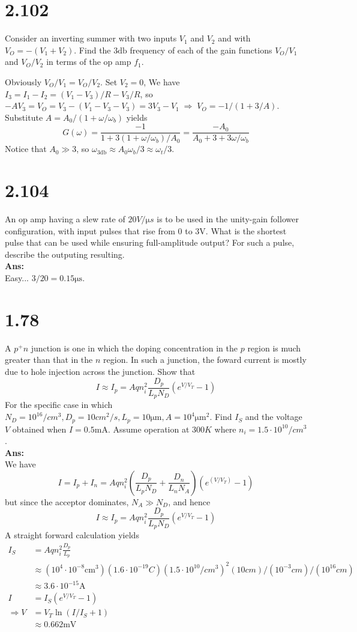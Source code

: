 \documentclass[12pt, a4paper]{article}
\newcommand{\samp}{\si{\ampere}}
\newcommand{\smia}{\si{\milli\ampere}}
\newcommand{\svol}{\si{\volt}}
\newcommand{\sdb}{\si{\decibel}}
\newcommand{\Ans}{{\\ \bf Ans:} \\}
\begin{document}
\section{2.102}
Consider an inverting summer with two inputs $V_1$ and $V_2$ and with $V_O = -(V_1 + V_2)$. Find the $3 \sdb$ frequency of each of the gain functions $V_O / V_1$ and $V_O / V_2$ in terms of the op amp $f_1$.

Obviously $V_O / V_1 = V_O / V_2$.
Set $V_2 = 0$, We have $I_3 = I_1 - I_2 = (V_1 - V_3) / R - V_3 / R$, so $-AV_3 = V_O = V_3 - (V_1 - V_3 - V_3) = 3V_3 - V_1 \; \Rightarrow \; V_O = -1 / (1 + 3 / A)$. Substitute $A = A_0 / (1 + \omega / \omega_b)$ yields 
\[
  G(\omega) = \frac{-1}{1 + 3(1 + \omega / \omega_b) / A_0} = \frac{-A_0}{A_0 + 3 + 3 \omega / \omega_b}
\]
Notice that $A_0 \gg 3$, so $\omega_{3\sdb} \approx A_0 \omega_b / 3 \approx \omega_t / 3 $.

\section{2.104}
An op amp having a slew rate of $20 \si{V/\micro s}$ is to be used in the unity-gain follower configuration, with input pulses that rise from $0$ to $3\svol$. What is the shortest pulse that can be used while ensuring full-amplitude output? For such a pulse, describe the outputing resulting.
\Ans
Easy... $3 / 20 = 0.15 \si{\micro\second}$.

\section{1.78}
A $p^+n$ junction is one in which the doping concentration in the $p$ region is much greater than that in the $n$ region. In such a junction, the foward current is mostly due to hole injection across the junction. Show that
\[
  I \approx I_p = Aqn_i^2\frac{D_p}{L_p N_D} \left( e^{V/V_T} - 1 \right)
\]
For the specific case in which $N_D = 10^{16} \si{/cm^3}, D_p = 10 \si{cm^2/s}, L_p = 10 \si{\micro\meter}, A = 10^4 \si{\micro \meter^2}$. Find $I_S$ and the voltage $V$ obtained when $I = 0.5\smia$. Assume operation at $300 \si{K}$ where $n_i = 1.5 \cdot 10^{10} \si{/cm^3}$.
\Ans
We have
\[
  I = I_p + I_n = Aqn_i^2 \left( \frac{D_p}{L_p N_D} + \frac{D_n}{L_n N_A} \right) \left(e^{(V / V_T)} - 1 \right)
\]
but since the acceptor dominates, $N_A \gg N_D$, and hence
\[
  I \approx I_p = Aqn_i^2\frac{D_p}{L_p N_D} \left( e^{V/V_T} - 1 \right)
\]
A straight forward calculation yields
\begin{align*}
  I_S &= Aqn_i^2\frac{D_p}{L_p}  \\
  &\approx (10^4 \cdot 10^{-8} \si{\centi\meter^3})(1.6 \cdot 10^{-19} \si{C})(1.5\cdot10^{10} \si{/cm^3})^2 (10 \si{cm}) / (10^{-3} \si{cm}) / (10^{16} \si{cm}) \\
  &\approx 3.6 \cdot 10^{-15} \samp \\
  I &= I_S \left( e^{V/V_T} - 1\right) \\
  \Rightarrow V &= V_T \ln (I / I_S + 1) \\
  &\approx 0.662 \si{\milli\volt}
\end{align*}
\end{document}
